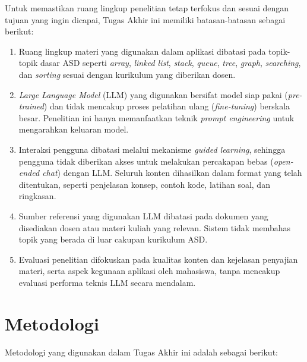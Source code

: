 Untuk memastikan ruang lingkup penelitian tetap terfokus dan sesuai dengan tujuan yang ingin dicapai, Tugas Akhir ini memiliki batasan-batasan sebagai berikut:

\begin{enumerate}
    \item Ruang lingkup materi yang digunakan dalam aplikasi dibatasi pada topik-topik dasar ASD seperti \textit{array}, \textit{linked list}, \textit{stack}, \textit{queue}, \textit{tree}, \textit{graph}, \textit{searching}, dan \textit{sorting} sesuai dengan kurikulum yang diberikan dosen.
    \item \textit{Large Language Model} (LLM) yang digunakan bersifat model siap pakai (\textit{pre-trained}) dan tidak mencakup proses pelatihan ulang (\textit{fine-tuning}) berskala besar. Penelitian ini hanya memanfaatkan teknik \textit{prompt engineering} untuk mengarahkan keluaran model.
    \item Interaksi pengguna dibatasi melalui mekanisme \textit{guided learning}, sehingga pengguna tidak diberikan akses untuk melakukan percakapan bebas (\textit{open-ended chat}) dengan LLM. Seluruh konten dihasilkan dalam format yang telah ditentukan, seperti penjelasan konsep, contoh kode, latihan soal, dan ringkasan.
    \item Sumber referensi yang digunakan LLM dibatasi pada dokumen yang disediakan dosen atau materi kuliah yang relevan. Sistem tidak membahas topik yang berada di luar cakupan kurikulum ASD.
    \item Evaluasi penelitian difokuskan pada kualitas konten dan kejelasan penyajian materi, serta aspek kegunaan aplikasi oleh mahasiswa, tanpa mencakup evaluasi performa teknis LLM secara mendalam.
\end{enumerate}

\section{Metodologi}

Metodologi yang digunakan dalam Tugas Akhir ini adalah sebagai berikut:

